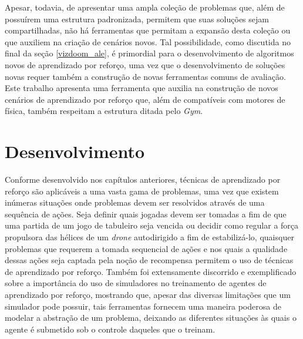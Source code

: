 \documentclass[cic,tc]{iiufrgs}
\begin{document}
Apesar, todavia, de apresentar uma ampla coleção de problemas que, além de
possuírem uma estrutura padronizada, permitem que suas soluções sejam
compartilhadas, não há ferramentas que permitam a expansão desta coleção ou que
auxiliem na criação de cenários novos. Tal possibilidade, como discutida no
final da seção \ref{vizdoom_ale}, é primordial para o desenvolvimento de
algoritmos novos de aprendizado por reforço, uma vez que o desenvolvimento de
soluções novas requer também a construção de novas ferramentas comuns de
avaliação. Este trabalho apresenta uma ferramenta que auxilia na construção de
novos cenários de aprendizado por reforço que, além de compatíveis com motores
de física, também respeitam a estrutura ditada pelo \textit{Gym}.



\chapter{Desenvolvimento}
\label{desenvolvimento}


Conforme desenvolvido nos capítulos anteriores, técnicas de aprendizado por
reforço são aplicáveis a uma vasta gama de problemas, uma vez que existem
inúmeras situações onde problemas devem ser resolvidos através de uma sequência
de ações. Seja definir quais jogadas devem ser tomadas a fim de que uma partida
de um jogo de tabuleiro seja vencida ou decidir como regular a força propulsora
das hélices de um \textit{drone} autodirigido a fim de estabilizá-lo, quaisquer
problemas que requerem a tomada sequencial de ações e nos quais a qualidade
dessas ações seja captada pela noção de recompensa permitem o uso de técnicas de
aprendizado por reforço. Também foi extensamente discorrido e exemplificado
sobre a importância do uso de simuladores no treinamento de agentes de
aprendizado por reforço, mostrando que, apesar das diversas limitações que um
simulador pode possuir, tais ferramentas fornecem uma maneira poderosa de
modelar a abstração de um problema, deixando as diferentes situações às quais
o agente é submetido sob o controle daqueles que o treinam.
\end{document}
